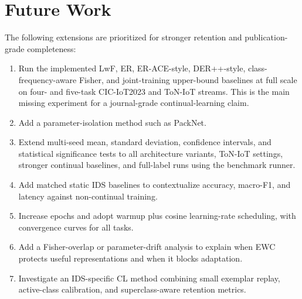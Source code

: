 \documentclass[a4paper,fleqn]{cas-dc}
\begin{document}
\section{Future Work}
The following extensions are prioritized for stronger retention and publication-grade completeness:
\begin{enumerate}
\item Run the implemented LwF, ER, ER-ACE-style, DER++-style, class-frequency-aware Fisher, and joint-training upper-bound baselines at full scale on four- and five-task CIC-IoT2023 and ToN-IoT streams. This is the main missing experiment for a journal-grade continual-learning claim.
\item Add a parameter-isolation method such as PackNet.
\item Extend multi-seed mean, standard deviation, confidence intervals, and statistical significance tests to all architecture variants, ToN-IoT settings, stronger continual baselines, and full-label runs using the benchmark runner.
\item Add matched static IDS baselines to contextualize accuracy, macro-F1, and latency against non-continual training.
\item Increase epochs and adopt warmup plus cosine learning-rate scheduling, with convergence curves for all tasks.
\item Add a Fisher-overlap or parameter-drift analysis to explain when EWC protects useful representations and when it blocks adaptation.
\item Investigate an IDS-specific CL method combining small exemplar replay, active-class calibration, and superclass-aware retention metrics.
\end{enumerate}
\end{document}

